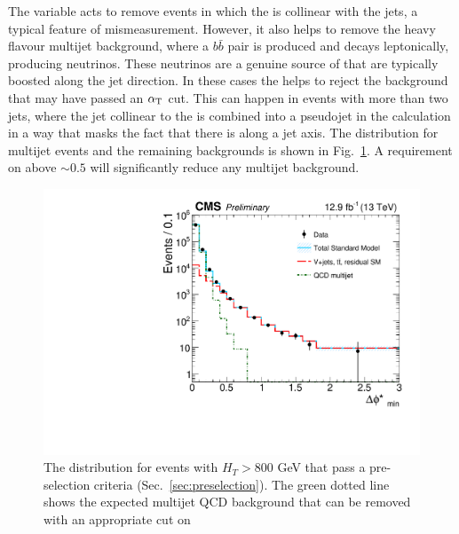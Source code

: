 The \bdphi variable acts to remove events in which the \MET is
collinear with the jets, a typical feature of mismeasurement. However,
it also helps to remove the heavy flavour \QCD multijet background,
where a $b\bar{b}$ pair is produced and decays leptonically, producing
neutrinos. These neutrinos are a genuine source of \MET that are
typically boosted along the jet direction. In these cases the \bdphi
helps to reject the \QCD background that may have passed an $\alpha_{\text{T}}$
cut. This can happen in events with more than two jets, where the
jet collinear to the \MET is combined into a pseudojet in the \alphat
calculation in a way that masks the fact that there is \MET along a jet
axis. The
\bdphi distribution for multijet events and the remaining \SM
backgrounds is shown in Fig.~\ref{fig:bdphi}. A requirement on \bdphi
above $\sim 0.5$ will significantly reduce any \QCD multijet
background.

\begin{figure}
	\begin{center}
		\includegraphics[width=0.7\linewidth]{figs/analysis/eventSelection/CMS-PAS-SUS-16-016_Figure-aux_002}%
	\end{center}
  \caption{The \bdphi distribution for events with $H_T>800$ GeV that
  pass a pre-selection criteria (Sec.~\ref{sec:preselection}). The
  green dotted line shows the expected multijet QCD background that
  can be removed with an appropriate cut on \bdphi}
	\label{fig:bdphi}
\end{figure}


